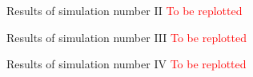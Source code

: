 \begin{figure}[htb]
  \caption{Results of simulation number II \textcolor{red}{To be replotted}}
  \label{fig:simulation_2_act_power}
\end{figure}

\begin{figure}[htb]
  \caption{Results of simulation number III \textcolor{red}{To be replotted}}
  \label{fig:simulation_3_act_power}
\end{figure}

\begin{figure}[htb]
  \caption{Results of simulation number IV \textcolor{red}{To be replotted}}
  \label{fig:simulation_4_act_power}
\end{figure}

